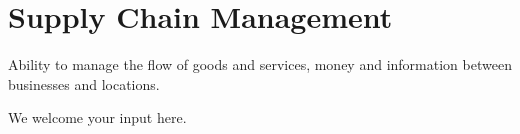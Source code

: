\section{Supply Chain Management}\label{sec:ekgmm-a-3-3}

Ability to  manage the flow of goods and services, money and information between businesses and locations.

We welcome your input here.

